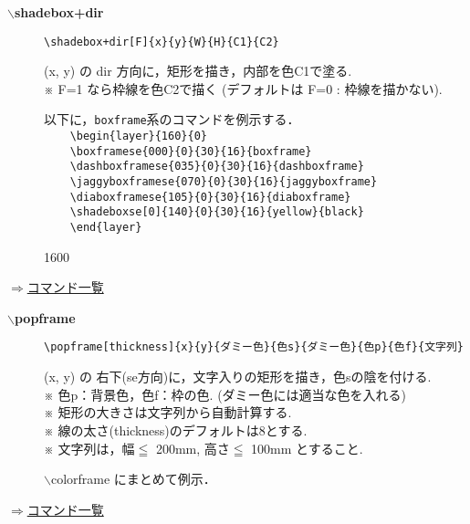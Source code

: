 \documentclass[a4j,12pt,dvipdfmx]{ujarticle}
\newcommand{\bs}{$\backslash$}
\newenvironment{cmd}[2]{%
\hypertarget{#2}{}
\begin{center}{\bf\large #1}\end{center}
\begin{description}
}{
\end{description}
\begin{flushright} \hyperlink{functionlist}{$\Rightarrow$コマンド一覧}\end{flushright}
}
\newcommand{\itemketj}[1]{
\item[\Ltab{15mm}{#1}]
}
\newcommand{\Chuu}[1][6.7mm]{%
\Ltab{#1}{}※ %
}
\begin{document}
\begin{cmd}{\bs shadebox+dir}{shadebox}
\itemketj{使用法}\verb|\shadebox+dir[F]{x}{y}{W}{H}{C1}{C2}|
\itemketj{説明}(x, y) の dir 方向に，矩形を描き，内部を色C1で塗る.\\
\Chuu F=1 なら枠線を色C2で描く (デフォルトは F=0 : 枠線を描かない).

\vspace{\baselineskip}
以下に，\verb|boxframe|系のコマンドを例示する．\\
\verb|    \begin{layer}{160}{0}|\\
\verb|    \boxframese{000}{0}{30}{16}{boxframe}|\\
\verb|    \dashboxframese{035}{0}{30}{16}{dashboxframe}|\\
\verb|    \jaggyboxframese{070}{0}{30}{16}{jaggyboxframe}|\\
\verb|    \diaboxframese{105}{0}{30}{16}{diaboxframe}|\\
\verb|    \shadeboxse[0]{140}{0}{30}{16}{yellow}{black}|\\
\verb|    \end{layer}|

\vspace{\baselineskip}
\begin{layer}{160}{0}
\end{layer}

\vspace{15mm}
\end{cmd}
\begin{cmd}{\bs popframe}{popframe}
\itemketj{使用法}\verb|\popframe[thickness]{x}{y}{ダミー色}{色s}{ダミー色}{色p}{色f}{文字列}|
\itemketj{説明}(x, y) の 右下(se方向)に，文字入りの矩形を描き，色sの陰を付ける. \\
\Chuu 色p：背景色，色f：枠の色.
(ダミー色には適当な色を入れる)\\
\Chuu 矩形の大きさは文字列から自動計算する.\\
\Chuu 線の太さ(thickness)のデフォルトは8とする.\\
\Chuu 文字列は，幅$\leqq$ 200mm, 高さ$\leqq$ 100mm とすること.
\itemketj{例}{\bs colorframe} にまとめて例示．
\end{cmd}
\end{document}
